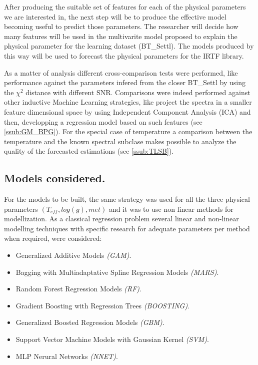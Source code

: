 {
After producing the suitable set of features for each of the 
physical parameters we are interested in, the next step will be
to produce the effective model becoming useful to predict those 
parameters. 
The researcher will decide how many features will be used in the 
multivarite model proposed to explain the physical parameter for 
the learning dataset (BT\_Settl). 
The models produced by this way will be used to forecast the 
physical parameters for the IRTF library.

As a matter of analysis different cross-comparison tests
were performed, like performance against the parameters
infered from the closer BT\_Settl by using the $\chi^2$ distance 
with different SNR. Comparisons were indeed performed against 
other inductive Machine Learning strategies, like project 
the spectra in a smaller feature dimensional space by using
Independent Component Analysis (ICA) and then, developping 
a regression model based on such features (see \ref{ssub:GM_BPG}).
For the special case of temperature a comparison between the
temperature and the known spectral subclase makes possible to 
analyze the quality of the forecasted estimations (see \ref{ssub:TLSB}).
}

\subsection{Models considered.}
\label {ssub:models}
{
For the models to be built, the same strategy was used for all the 
three physical parameters $(T_{eff}, log(g), met)$ 
and it was to use non linear methods for modellization.
As a classical regression problem several linear and non-linear
modelling techniques with specific research for 
adequate parameters per method when required, were considered:
\begin{itemize}
 \item {Generalized Additive Models \emph{(GAM)}.}
 \item {Bagging with Multiadaptative Spline Regression Models \emph{(MARS)}.}
 \item {Random Forest Regression Models \emph{(RF)}.} 
 \item {Gradient Boosting with Regression Trees \emph{(BOOSTING)}.}
 \item {Generalized Boosted Regression Models \emph{(GBM)}.}
 \item {Support Vector Machine Models with Gaussian Kernel \emph{(SVM)}.}
 \item {MLP Nerural Networks \emph{(NNET)}.}
\end{itemize}

}

